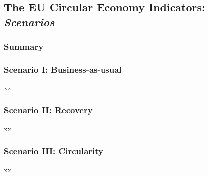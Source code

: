 \subsection{The EU Circular Economy Indicators: \textit{Scenarios}}\label{subsec:cei-scenarios}


\subsubsection{Summary}


\clearpage

\subsubsection[Scenario I: Business-as-usual]{\iconBAU Scenario I: Business-as-usual}

xx \\


\wasteSubsubsubsecBATT

\wasteSubsubsubsecCDW

\wasteSubsubsubsecELV

\wasteSubsubsubsecMIN

\wasteSubsubsubsecSLASH

\wasteSubsubsubsecWEEE

\subsectionEndline
\clearpage

\subsubsection[Scenario II: Recovery]{\iconREC Scenario II: Recovery}

xx \\


\wasteSubsubsubsecBATT

\wasteSubsubsubsecCDW

\wasteSubsubsubsecELV

\wasteSubsubsubsecMIN

\wasteSubsubsubsecSLASH

\wasteSubsubsubsecWEEE

\subsectionEndline
\clearpage


\subsubsection[Scenario III: Circularity]{\iconCIR Scenario III: Circularity}

xx \\


\wasteSubsubsubsecBATT

\wasteSubsubsubsecCDW

\wasteSubsubsubsecELV

\wasteSubsubsubsecMIN

\wasteSubsubsubsecSLASH

\wasteSubsubsubsecWEEE

\sectionEndlines
\clearpage